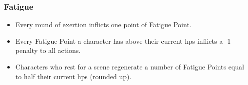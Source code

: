 \subsubsection*{Fatigue}
\begin{itemize}
  \item
  Every round of exertion inflicts one point of Fatigue Point.
  \item
  Every Fatigue Point a character has above their current \glspl{hp} inflicts a -1 penalty to all actions.
  \item
  Characters who rest for a scene regenerate a number of Fatigue Points equal to half their current \glspl{hp} (rounded up).
\end{itemize}
